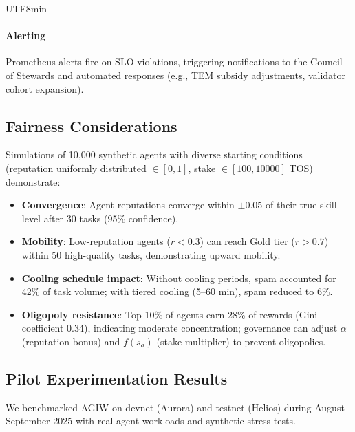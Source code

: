 \documentclass[11pt]{article}
\begin{document}
\begin{CJK}{UTF8}{min}
\paragraph{Alerting} Prometheus alerts fire on SLO violations, triggering notifications to the Council of Stewards and automated responses (e.g., TEM subsidy adjustments, validator cohort expansion).

\subsection{Fairness Considerations}
Simulations of 10,000 synthetic agents with diverse starting conditions (reputation uniformly distributed $\in [0,1]$, stake $\in [100, 10000]$ TOS) demonstrate:
\begin{itemize}[noitemsep]
  \item \textbf{Convergence}: Agent reputations converge within $\pm0.05$ of their true skill level after 30 tasks (95\% confidence).
  \item \textbf{Mobility}: Low-reputation agents ($r<0.3$) can reach Gold tier ($r>0.7$) within 50 high-quality tasks, demonstrating upward mobility.
  \item \textbf{Cooling schedule impact}: Without cooling periods, spam accounted for 42\% of task volume; with tiered cooling (5--60 min), spam reduced to 6\%.
  \item \textbf{Oligopoly resistance}: Top 10\% of agents earn 28\% of rewards (Gini coefficient 0.34), indicating moderate concentration; governance can adjust $\alpha$ (reputation bonus) and $f(s_a)$ (stake multiplier) to prevent oligopolies.
\end{itemize}

\subsection{Pilot Experimentation Results}
\label{sec:pilot-results}
We benchmarked AGIW on devnet (Aurora) and testnet (Helios) during August--September 2025 with real agent workloads and synthetic stress tests.


\end{CJK}
\end{document}
